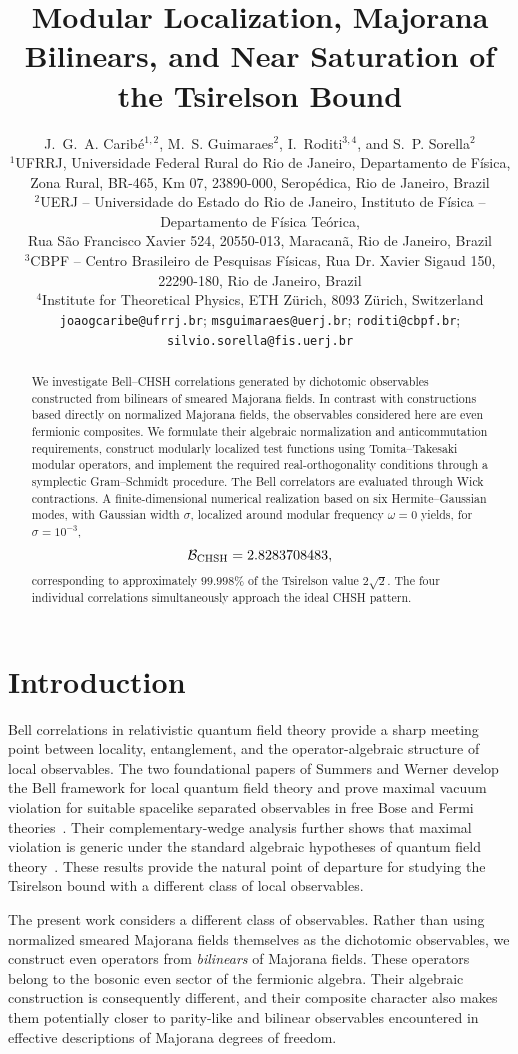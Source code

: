 \documentclass[11pt]{article}
\title{\bfseries Modular Localization, Majorana Bilinears, and Near Saturation of the Tsirelson Bound}
\author{J.~G.~A. Carib\'e$^{1,2}$, M.~S. Guimaraes$^{2}$, I.~Roditi$^{3,4}$, and S.~P. Sorella$^{2}$\\[0.6em]
\small $^{1}$UFRRJ, Universidade Federal Rural do Rio de Janeiro, Departamento de F\'isica,\\
\small Zona Rural, BR-465, Km 07, 23890-000, Serop\'edica, Rio de Janeiro, Brazil\\
\small $^{2}$UERJ -- Universidade do Estado do Rio de Janeiro, Instituto de F\'isica -- Departamento de F\'isica Te\'orica,\\
\small Rua S\~ao Francisco Xavier 524, 20550-013, Maracan\~a, Rio de Janeiro, Brazil\\
\small $^{3}$CBPF -- Centro Brasileiro de Pesquisas F\'isicas, Rua Dr. Xavier Sigaud 150, 22290-180, Rio de Janeiro, Brazil\\
\small $^{4}$Institute for Theoretical Physics, ETH Z\"urich, 8093 Z\"urich, Switzerland\\[0.6em]
\small \texttt{joaogcaribe@ufrrj.br}; \texttt{msguimaraes@uerj.br}; \texttt{roditi@cbpf.br}; \texttt{silvio.sorella@fis.uerj.br}}
\date{}
\begin{document}
\maketitle

\begin{abstract}
We investigate Bell--CHSH correlations generated by dichotomic observables constructed from bilinears of smeared Majorana fields. In contrast with constructions based directly on normalized Majorana fields, the observables considered here are even fermionic composites. We formulate their algebraic normalization and anticommutation requirements, construct modularly localized test functions using Tomita--Takesaki modular operators, and implement the required real-orthogonality conditions through a symplectic Gram--Schmidt procedure. The Bell correlators are evaluated through Wick contractions. A finite-dimensional numerical realization based on six Hermite--Gaussian modes, with Gaussian width $\sigma$, localized around modular frequency $\omega=0$ yields, for $\sigma=10^{-3}$,
\[
\mathcal B_{\rm CHSH}=2.8283708483,
\]
corresponding to approximately $99.998\%$ of the Tsirelson value $2\sqrt2$. The four individual correlations simultaneously approach the ideal CHSH pattern.
\end{abstract}

\section{Introduction}

Bell correlations in relativistic quantum field theory provide a sharp meeting point between locality, entanglement, and the operator-algebraic structure of local observables. The two foundational papers of Summers and Werner develop the Bell framework for local quantum field theory and prove maximal vacuum violation for suitable spacelike separated observables in free Bose and Fermi theories~\cite{SummersWernerI,SummersWernerII}. Their complementary-wedge analysis further shows that maximal violation is generic under the standard algebraic hypotheses of quantum field theory~\cite{SummersWernerGeneric}. These results provide the natural point of departure for studying the Tsirelson bound with a different class of local observables.

The present work considers a different class of observables. Rather than using normalized smeared Majorana fields themselves as the dichotomic observables, we construct even operators from \emph{bilinears} of Majorana fields. These operators belong to the bosonic even sector of the fermionic algebra. Their algebraic construction is consequently different, and their composite character also makes them potentially closer to parity-like and bilinear observables encountered in effective descriptions of Majorana degrees of freedom.
\end{document}
